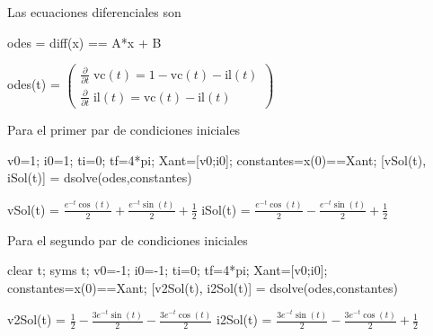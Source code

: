 \documentclass[10pt,a4paper]{article} %
\begin{document}
\begin{par}
	\begin{flushleft}
		Las ecuaciones diferenciales son
	\end{flushleft}
\end{par}

\begin{matlabcode}
	odes = diff(x) == A*x + B
\end{matlabcode}
\begin{matlabsymbolicoutput}
	odes(t) = 
	$\displaystyle \left(\begin{array}{c}
	\frac{\partial }{\partial t}\;\textrm{vc}\left(t\right)=1-\textrm{vc}\left(t\right)-\textrm{il}\left(t\right)\\
	\frac{\partial }{\partial t}\;\textrm{il}\left(t\right)=\textrm{vc}\left(t\right)-\textrm{il}\left(t\right)
	\end{array}\right)$
\end{matlabsymbolicoutput}


\begin{par}
	\begin{flushleft}
		Para el primer par de condiciones iniciales
	\end{flushleft}
\end{par}

\begin{matlabcode}
	v0=1;
	i0=1;
	ti=0;
	tf=4*pi;
	Xant=[v0;i0];
	constantes=x(0)==Xant;
	[vSol(t), iSol(t)] = dsolve(odes,constantes)
\end{matlabcode}
\begin{matlabsymbolicoutput}
	vSol(t) = 
	$\displaystyle \frac{e^{-t}  \cos \left(t\right)}{2}+\frac{e^{-t}  \sin \left(t\right)}{2}+\frac{1}{2}$
	iSol(t) = 
	$\displaystyle \frac{e^{-t}  \cos \left(t\right)}{2}-\frac{e^{-t}  \sin \left(t\right)}{2}+\frac{1}{2}$
\end{matlabsymbolicoutput}


\begin{par}
	\begin{flushleft}
		Para el segundo par de condiciones iniciales
	\end{flushleft}
\end{par}

\begin{matlabcode}
	clear t;
	syms t;
	v0=-1;
	i0=-1;
	ti=0;
	tf=4*pi;
	Xant=[v0;i0];
	constantes=x(0)==Xant;
	[v2Sol(t), i2Sol(t)] = dsolve(odes,constantes)
\end{matlabcode}
\begin{matlabsymbolicoutput}
	v2Sol(t) = 
	$\displaystyle \frac{1}{2}-\frac{3 e^{-t}  \sin \left(t\right)}{2}-\frac{3 e^{-t}  \cos \left(t\right)}{2}$
	i2Sol(t) = 
	$\displaystyle \frac{3 e^{-t}  \sin \left(t\right)}{2}-\frac{3 e^{-t}  \cos \left(t\right)}{2}+\frac{1}{2}$
\end{matlabsymbolicoutput}
\end{document}
